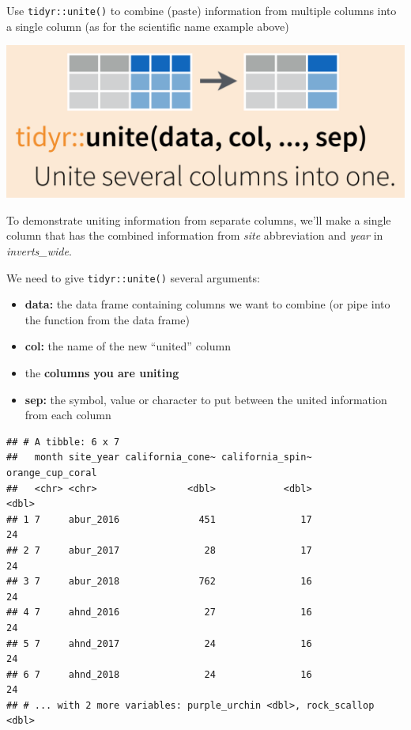 \documentclass[]{book}
\newenvironment{Shaded}{\begin{snugshade}}{\end{snugshade}}
\newcommand{\CommentTok}[1]{\textcolor[rgb]{0.56,0.35,0.01}{\textit{#1}}}
\newcommand{\DataTypeTok}[1]{\textcolor[rgb]{0.13,0.29,0.53}{#1}}
\newcommand{\KeywordTok}[1]{\textcolor[rgb]{0.13,0.29,0.53}{\textbf{#1}}}
\newcommand{\NormalTok}[1]{#1}
\newcommand{\OperatorTok}[1]{\textcolor[rgb]{0.81,0.36,0.00}{\textbf{#1}}}
\newcommand{\StringTok}[1]{\textcolor[rgb]{0.31,0.60,0.02}{#1}}
\providecommand{\tightlist}{%
  \setlength{\itemsep}{0pt}\setlength{\parskip}{0pt}}
\begin{document}
Use \texttt{tidyr::unite()} to combine (paste) information from multiple columns into a single column (as for the scientific name example above)

\includegraphics{img/rstudio-cheatsheet-unite.png}

To demonstrate uniting information from separate columns, we'll make a single column that has the combined information from \emph{site} abbreviation and \emph{year} in \emph{inverts\_wide}.

We need to give \texttt{tidyr::unite()} several arguments:

\begin{itemize}
\tightlist
\item
  \textbf{data:} the data frame containing columns we want to combine (or pipe into the function from the data frame)
\item
  \textbf{col:} the name of the new ``united'' column
\item
  the \textbf{columns you are uniting}
\item
  \textbf{sep:} the symbol, value or character to put between the united information from each column
\end{itemize}

\begin{Shaded}
\end{Shaded}

\begin{verbatim}
## # A tibble: 6 x 7
##   month site_year california_cone~ california_spin~ orange_cup_coral
##   <chr> <chr>                <dbl>            <dbl>            <dbl>
## 1 7     abur_2016              451               17               24
## 2 7     abur_2017               28               17               24
## 3 7     abur_2018              762               16               24
## 4 7     ahnd_2016               27               16               24
## 5 7     ahnd_2017               24               16               24
## 6 7     ahnd_2018               24               16               24
## # ... with 2 more variables: purple_urchin <dbl>, rock_scallop <dbl>
\end{verbatim}
\end{document}
